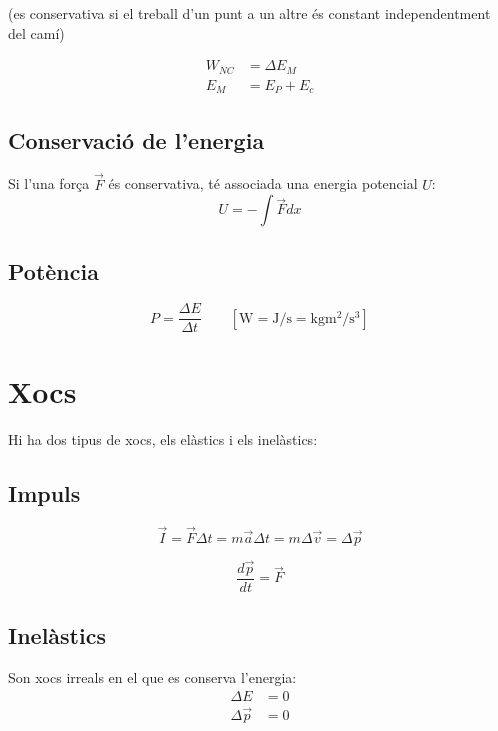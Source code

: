 \begin{center}
    (es conservativa si el treball d'un punt a un altre és constant independentment del camí)
\end{center}

\begin{align}
    W_{NC} &= \Delta E_M \\
    E_M &= E_P + E_c
\end{align}

\subsection{Conservació de l'energia}
Si l'una força $\vec{F}$ és conservativa, té associada una energia potencial $U$:
\begin{equation}
    U = - \int \vec{F} dx 
\end{equation}
\subsection{Potència}
\begin{equation}
    P = \frac{\Delta E}{\Delta t} \qquad \left[  \si{\watt} =\si{\joule\per\second} = \si{\kilo\gram\metre\squared\per\second\cubed}\right]
\end{equation}

\section{Xocs}
Hi ha dos tipus de xocs, els elàstics i els inelàstics:

\subsection{Impuls}
\begin{equation}
    \vec{I} = \vec{F}\Delta t = m \vec{a} \Delta t = m \Delta \vec{v} = \Delta \vec{p}
\end{equation}

\begin{equation}
    \frac{d\vec{p}}{dt} = \vec{F}
\end{equation}

\subsection{Inelàstics}
Son xocs irreals en el que es conserva l'energia:
\begin{align}
    \Delta E &= 0 \\
    \Delta \vec{p} &= 0
\end{align}



